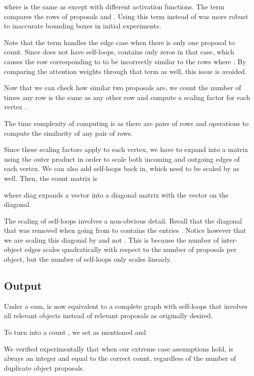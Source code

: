 \documentclass[letterpaper]{article}
\begin{document}
where  is the same as  except with different activation functions.
The  term compares the rows of proposals  and .
Using this term instead of  was more robust to inaccurate bounding boxes in initial experiments.

Note that the  term handles the edge case when there is only one proposal to count.
Since  does not have self-loops,  contains only zeros in that case, which causes the row corresponding to  to be incorrectly similar to the rows where .
By comparing the attention weights through that term as well, this issue is avoided.

Now that we can check how similar two proposals are, we count the number of times any row is the same as any other row and compute a scaling factor  for each vertex .



The time complexity of computing  is  as there are  pairs of rows and  operations to compute the similarity of any pair of rows.

Since these scaling factors apply to each vertex, we have to expand  into a matrix using the outer product in order to scale both incoming and outgoing edges of each vertex.
We can also add self-loops back in, which need to be scaled by  as well.
Then, the count matrix  is



where diag expands a vector into a diagonal matrix with the vector on the diagonal.

The scaling of self-loops involves a non-obvious detail.
Recall that the diagonal that was removed when going from  to  contains the entries .
Notice however that we are scaling this diagonal by  and not .
This is because the number of inter-object edges scales quadratically with respect to the number of proposals per object, but the number of self-loops only scales linearly.

\subsection{Output}
Under a sum,  is now equivalent to a complete graph with self-loops that involves all relevant objects instead of relevant proposals as originally desired.

To turn  into a count , we set  as mentioned and


We verified experimentally that when our extreme case assumptions hold,  is always an integer and equal to the correct count, regardless of the number of duplicate object proposals.
\end{document}
